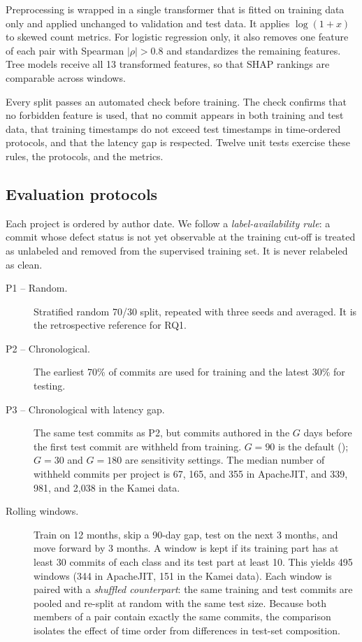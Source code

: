 Preprocessing is wrapped in a single transformer that is fitted on training data only and applied unchanged to validation and test data. It applies $\log(1+x)$ to skewed count metrics. For logistic regression only, it also removes one feature of each pair with Spearman $|\rho|>0.8$ and standardizes the remaining features. Tree models receive all 13 transformed features, so that SHAP rankings are comparable across windows.

Every split passes an automated check before training. The check confirms that no forbidden feature is used, that no commit appears in both training and test data, that training timestamps do not exceed test timestamps in time-ordered protocols, and that the latency gap is respected. Twelve unit tests exercise these rules, the protocols, and the metrics.

\subsection{Evaluation protocols}\label{sec:protocols}

Each project is ordered by author date. We follow a \emph{label-availability rule}: a commit whose defect status is not yet observable at the training cut-off is treated as unlabeled and removed from the supervised training set. It is never relabeled as clean.

\begin{description}
\item[P1 -- Random.] Stratified random 70/30 split, repeated with three seeds and averaged. It is the retrospective reference for RQ1.
\item[P2 -- Chronological.] The earliest 70\% of commits are used for training and the latest 30\% for testing.
\item[P3 -- Chronological with latency gap.] The same test commits as P2, but commits authored in the $G$ days before the first test commit are withheld from training. $G=90$ is the default (\pthree); $G=30$ and $G=180$ are sensitivity settings. The median number of withheld commits per project is 67, 165, and 355 in ApacheJIT, and 339, 981, and 2{,}038 in the Kamei data.
\item[Rolling windows.] Train on 12 months, skip a 90-day gap, test on the next 3 months, and move forward by 3 months. A window is kept if its training part has at least 30 commits of each class and its test part at least 10. This yields 495 windows (344 in ApacheJIT, 151 in the Kamei data). Each window is paired with a \emph{shuffled counterpart}: the same training and test commits are pooled and re-split at random with the same test size. Because both members of a pair contain exactly the same commits, the comparison isolates the effect of time order from differences in test-set composition.
\end{description}

